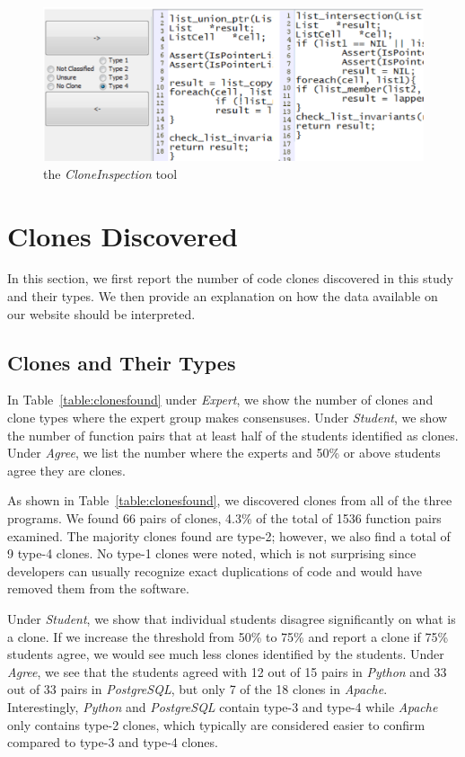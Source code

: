 \documentclass{sig-alternate}
\begin{document}

\begin{figure}[ht!]
\centering
\includegraphics[width=\columnwidth, angle = 0]{tool.eps}
\caption{the {\it CloneInspection} tool}
\label{fig:clonediff}
\end{figure}


\section{Clones Discovered}
In this section, we first report the number of code clones discovered in this study and their types. We then provide an explanation on how the data available on our website should be interpreted.

\subsection{Clones and Their Types}

In Table~\ref{table:clonesfound} under {\it Expert}, we show the number of clones and clone types where the expert group makes consensuses. Under {\it Student}, we show the number of function pairs that at least half of the students identified as clones. Under {\it Agree}, we list the number where the experts and 50\% or above students agree they are clones.


As shown in Table~\ref{table:clonesfound}, we discovered clones from all of the three programs. We found 66 pairs of clones, 4.3\% of the total of 1536 function pairs examined. The majority clones found are type-2; however, we also find a total of 9 type-4 clones. No type-1 clones were noted, which is not surprising since developers can usually recognize exact duplications of code and would have removed them from the software.

Under {\it Student}, we show that individual students disagree significantly on what is a clone. If we increase the threshold from 50\% to 75\% and report a clone if 75\% students agree, we would see much less clones identified by the students. Under {\it Agree}, we see that the students agreed with 12 out of 15 pairs in {\it Python} and 33 out of 33 pairs in {\it PostgreSQL}, but only 7 of the 18 clones in {\it Apache}. Interestingly, {\it Python} and {\it PostgreSQL} contain type-3 and type-4 while {\it Apache} only contains type-2 clones, which typically are considered easier to confirm compared to type-3 and type-4 clones.
\end{document}
